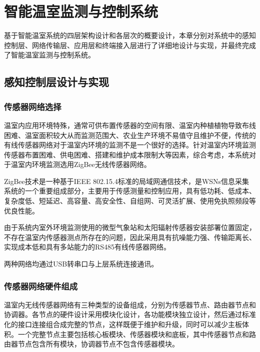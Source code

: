 

\chapter{智能温室监测与控制系统}
\label{chapter:IntelligentGreenhouseSystem}
基于智能温室系统的四层架构设计和各层次的概要设计，本章分别对系统中的感知控制层、网络传输层、应用层和终端接入层进行了详细地设计与实现，并最终完成了智能温室监测与控制系统。

\section{感知控制层设计与实现}
	\subsection{传感器网络选择}
温室内应用环境特殊，通常可供布置传感器的空间有限、温室内种植植物导致布线困难、温室面积较大从而监测范围大、农业生产环境不易值守且维护不便，传统的有线传感器网络对于温室内环境的监测不是一个很好的选择。针对温室内环境监测传感器布置困难、供电困难、搭建和维护成本限制大等因素，综合考虑，本系统对于温室内环境监测选用ZigBee无线传感器网络。

ZigBee技术是一种基于IEEE 802.15.4标准的局域网通信技术，是WSNs信息采集系统的一个重要组成部分，主要用于传感测量和控制应用，具有低功耗、低成本、复杂度低、短延迟、高容量、高安全性、自组网、可灵活扩展、使用免执照频段等优良性能。

由于系统内室外环境监测使用的微型气象站和太阳辐射传感器安装部署位置固定，不存在温室内传感器测点所存在的问题，因此采用具有抗噪能力强、传输距离长、实现成本低和具有多站能力的RS485有线传感器网络。

两种网络均通过USB转串口与上层系统连接通讯。
	\subsection{传感器网络硬件组成}
	温室内无线传感器网络有三种类型的设备组成，分别为传感器节点、路由器节点和协调器。各节点的硬件设计采用模块化设计，各功能模块独立设计，然后通过标准化的接口连接组合成完整的节点，这样既便于维护和升级，同时可以减少主板体积。一个完整节点主要包括核心板模块、传感器模块和底板，其中传感器节点和路由器节点包含所有模块，协调器节点不包含传感器模块。
